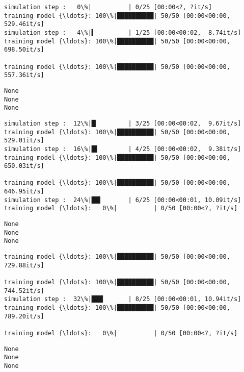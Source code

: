 \documentclass[11pt]{article}
\begin{document}
    \begin{Verbatim}[commandchars=\\\{\}]
simulation step :   0\%|          | 0/25 [00:00<?, ?it/s]
training model {\ldots}: 100\%|██████████| 50/50 [00:00<00:00, 529.46it/s]
simulation step :   4\%|▍         | 1/25 [00:00<00:02,  8.74it/s]
training model {\ldots}: 100\%|██████████| 50/50 [00:00<00:00, 698.50it/s]

training model {\ldots}: 100\%|██████████| 50/50 [00:00<00:00, 557.36it/s]
    \end{Verbatim}

    \begin{Verbatim}[commandchars=\\\{\}]
None
None
None
    \end{Verbatim}

    \begin{Verbatim}[commandchars=\\\{\}]
simulation step :  12\%|█▏        | 3/25 [00:00<00:02,  9.67it/s]
training model {\ldots}: 100\%|██████████| 50/50 [00:00<00:00, 529.01it/s]
simulation step :  16\%|█▌        | 4/25 [00:00<00:02,  9.38it/s]
training model {\ldots}: 100\%|██████████| 50/50 [00:00<00:00, 650.03it/s]

training model {\ldots}: 100\%|██████████| 50/50 [00:00<00:00, 646.95it/s]
simulation step :  24\%|██▍       | 6/25 [00:00<00:01, 10.09it/s]
training model {\ldots}:   0\%|          | 0/50 [00:00<?, ?it/s]
    \end{Verbatim}

    \begin{Verbatim}[commandchars=\\\{\}]
None
None
None
    \end{Verbatim}

    \begin{Verbatim}[commandchars=\\\{\}]
training model {\ldots}: 100\%|██████████| 50/50 [00:00<00:00, 729.88it/s]

training model {\ldots}: 100\%|██████████| 50/50 [00:00<00:00, 744.52it/s]
simulation step :  32\%|███▏      | 8/25 [00:00<00:01, 10.94it/s]
training model {\ldots}: 100\%|██████████| 50/50 [00:00<00:00, 789.20it/s]

training model {\ldots}:   0\%|          | 0/50 [00:00<?, ?it/s]
    \end{Verbatim}

    \begin{Verbatim}[commandchars=\\\{\}]
None
None
None
    \end{Verbatim}
\end{document}
